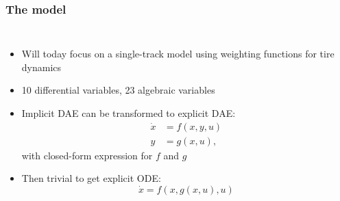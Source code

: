 \documentclass[]{beamer}
\begin{document}
\begin{frame}
\frametitle{The model}
\begin{columns}
\begin{itemize}
\item
Will today focus on a single-track model using weighting functions for tire dynamics
\item
10 differential variables, 23 algebraic variables
\item
Implicit DAE can be transformed to explicit DAE:
\begin{align*}
\dot x &= f(x, y, u) \\
y &= g(x, u),
\end{align*}
with closed-form expression for $f$ and $g$
\item
Then trivial to get explicit ODE:
\[\dot x = f(x, g(x, u), u)\]
\end{itemize}


\end{columns}
\end{frame}
\end{document}
